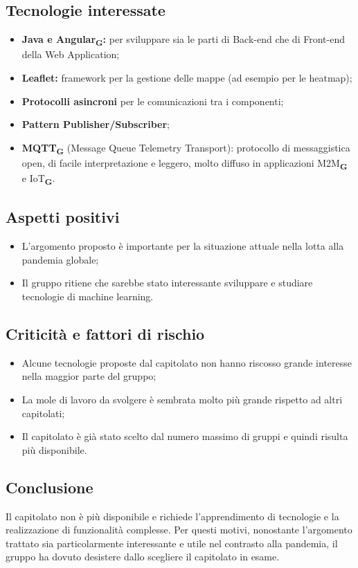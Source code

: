 \subsection{Tecnologie interessate}
\begin{itemize}
    \item \textbf{Java e Angular\textsubscript{\textbf{G}}:} per sviluppare sia le parti di Back-end che di Front-end della Web Application;
    \item \textbf{Leaflet:} framework per la gestione delle mappe (ad esempio per le heatmap);
    \item \textbf{Protocolli asincroni} per le comunicazioni tra i componenti;
    \item \textbf{Pattern Publisher/Subscriber};
    \item \textbf{MQTT\textsubscript{\textbf{G}}} (Message Queue Telemetry Transport): protocollo di messaggistica open, di facile interpretazione e leggero, molto diffuso in applicazioni M2M\textsubscript{\textbf{G}} e IoT\textsubscript{\textbf{G}}.
\end{itemize}

\subsection{Aspetti positivi}
\begin{itemize}
    \item L'argomento proposto è importante per la situazione attuale nella lotta alla pandemia globale;
    \item Il gruppo ritiene che sarebbe stato interessante sviluppare e studiare tecnologie di machine learning.
\end{itemize}

\subsection{Criticità e fattori di rischio}
\begin{itemize}
    \item Alcune tecnologie proposte dal capitolato non hanno riscosso grande interesse nella maggior parte del gruppo;
    \item La mole di lavoro da svolgere è sembrata molto più grande rispetto ad altri capitolati;
    \item Il capitolato è già stato scelto dal numero massimo di gruppi e quindi risulta più disponibile.
\end{itemize}
\subsection{Conclusione}
Il capitolato non è più disponibile e richiede l'apprendimento di tecnologie e la realizzazione di funzionalità complesse. Per questi motivi, 
nonostante l'argomento trattato sia particolarmente interessante e utile nel contrasto alla pandemia, il gruppo ha dovuto 
desistere dallo scegliere il capitolato in esame.